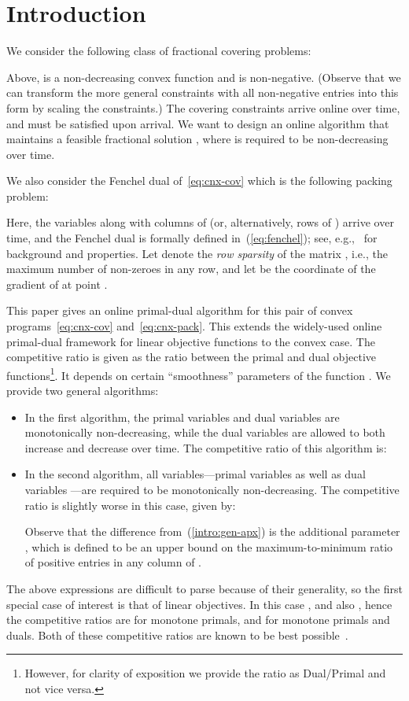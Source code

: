 \documentclass[letterpaper,11pt]{article}
\begin{document}
\newpage


\section{Introduction}

We consider the following class of fractional covering problems:

Above,  is a non-decreasing convex function and
 is non-negative. (Observe that we can transform the more
general constraints  with all non-negative entries into this
form by scaling the constraints.) The covering constraints  arrive online over time, and must be satisfied upon arrival. We
want to design an online algorithm that maintains a feasible fractional
solution , where  is required to be non-decreasing over time.

We also consider the Fenchel dual of~\eqref{eq:cnx-cov} which is the
following packing problem:

Here, the variables  along with columns of  (or,
alternatively, rows of ) arrive over time, and the Fenchel dual is
formally defined in~(\ref{eq:fenchel}); see, e.g.,~\cite{Rock} for
background and properties.
Let  denote the {\em row sparsity} of the matrix , i.e., the maximum number of non-zeroes in any row, and let  be the  coordinate of the gradient of  at point .

This paper gives an online primal-dual algorithm for this pair of convex
programs~\eqref{eq:cnx-cov} and~\eqref{eq:cnx-pack}. This extends the
widely-used online primal-dual framework for linear objective functions to the
convex case. The competitive ratio is given as the ratio between the primal and dual objective functions\footnote{However, for clarity of exposition we provide the ratio as
Dual/Primal and not vice versa.}. It depends on certain
``smoothness'' parameters of the function . We provide two general
algorithms:
\begin{itemize}
\item In the first algorithm, the primal variables  and dual variables  are monotonically non-decreasing, while the dual variables  are allowed to both increase and decrease over time. The competitive ratio of this algorithm is:
  



\item In the second algorithm, all variables---primal variables 
  as well as dual variables ---are required to be monotonically non-decreasing. The
  competitive ratio is slightly worse in this case, given by:
  
  Observe that the difference from~(\ref{intro:gen-apx}) is the additional
  parameter , which is defined to be an upper bound on the maximum-to-minimum ratio of positive
  entries in any column of .
\end{itemize}
The above expressions are difficult to parse because of their generality, so
the first special case of interest is that of linear objectives. In this
case , and also , hence the competitive ratios are  for monotone
primals, and  for monotone primals and duals. Both of
these competitive ratios are known to be best
possible~\cite{BN-MOR,GN12-mor}.
\end{document}
